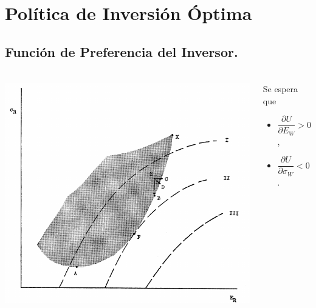 \documentclass{beamer}
\begin{document}

\addtocounter{part}{1}

\section[2. Política de Inversión Óptima.]{Política de Inversión Óptima} %

\subsection{Función de Preferencia del Inversor.} %
\begin{frame}[t,fragile]
	\frametitle{\subsecname}
	\vspace{-5mm}
	\begin{columns}[t]
		\vfill
		\includegraphics[width= \linewidth, page = 1]{IMAGES/1/2}
		\begin{block}{}
			Se espera que
			\begin{itemize}
				\item \(\dfrac{\partial U}{\partial E_W} > 0\),
				\item \(\dfrac{\partial U}{\partial \sigma _W} < 0\).
			\end{itemize}
		\end{block}
	\end{columns}
\end{frame}
\end{document}
